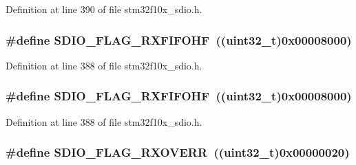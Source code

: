 Definition at line 390 of file stm32f10x\+\_\+sdio.\+h.

\subsubsection[{\texorpdfstring{S\+D\+I\+O\+\_\+\+F\+L\+A\+G\+\_\+\+R\+X\+F\+I\+F\+O\+HF}{SDIO_FLAG_RXFIFOHF}}]{\setlength{\rightskip}{0pt plus 5cm}\#define S\+D\+I\+O\+\_\+\+F\+L\+A\+G\+\_\+\+R\+X\+F\+I\+F\+O\+HF~(({\bf uint32\+\_\+t})0x00008000)}\hypertarget{group___s_d_i_o___flags_ga8c5942ae3df21efad2d7c61a46015758}{}\label{group___s_d_i_o___flags_ga8c5942ae3df21efad2d7c61a46015758}


Definition at line 388 of file stm32f10x\+\_\+sdio.\+h.

\subsubsection[{\texorpdfstring{S\+D\+I\+O\+\_\+\+F\+L\+A\+G\+\_\+\+R\+X\+F\+I\+F\+O\+HF}{SDIO_FLAG_RXFIFOHF}}]{\setlength{\rightskip}{0pt plus 5cm}\#define S\+D\+I\+O\+\_\+\+F\+L\+A\+G\+\_\+\+R\+X\+F\+I\+F\+O\+HF~(({\bf uint32\+\_\+t})0x00008000)}\hypertarget{group___s_d_i_o___flags_ga8c5942ae3df21efad2d7c61a46015758}{}\label{group___s_d_i_o___flags_ga8c5942ae3df21efad2d7c61a46015758}


Definition at line 388 of file stm32f10x\+\_\+sdio.\+h.

\subsubsection[{\texorpdfstring{S\+D\+I\+O\+\_\+\+F\+L\+A\+G\+\_\+\+R\+X\+O\+V\+E\+RR}{SDIO_FLAG_RXOVERR}}]{\setlength{\rightskip}{0pt plus 5cm}\#define S\+D\+I\+O\+\_\+\+F\+L\+A\+G\+\_\+\+R\+X\+O\+V\+E\+RR~(({\bf uint32\+\_\+t})0x00000020)}\hypertarget{group___s_d_i_o___flags_gad49d60039e40d31b734cfacf90caa84f}{}\label{group___s_d_i_o___flags_gad49d60039e40d31b734cfacf90caa84f}


